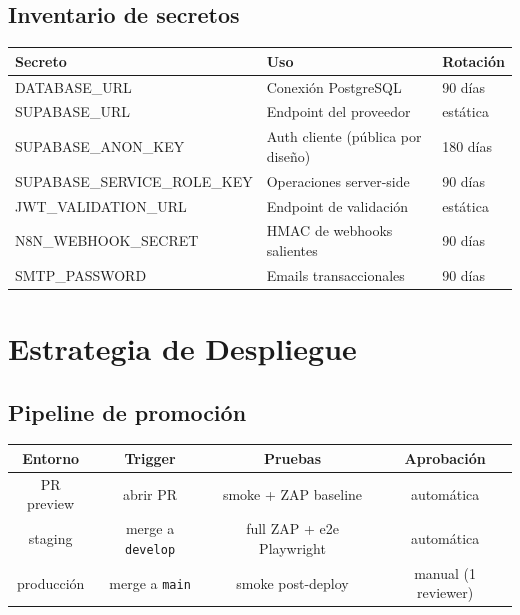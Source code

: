 \documentclass[12pt,a4paper,oneside]{article}
\begin{document}
\subsection{Inventario de secretos}

\begin{table}[h]
\centering
\small
\begin{tabularx}{\textwidth}{lXl}
\toprule
\textbf{Secreto} & \textbf{Uso} & \textbf{Rotación} \\
\midrule
DATABASE\_URL & Conexión PostgreSQL & 90 días \\
SUPABASE\_URL & Endpoint del proveedor & estática \\
SUPABASE\_ANON\_KEY & Auth cliente (pública por diseño) & 180 días \\
SUPABASE\_SERVICE\_ROLE\_KEY & Operaciones server-side & 90 días \\
JWT\_VALIDATION\_URL & Endpoint de validación & estática \\
N8N\_WEBHOOK\_SECRET & HMAC de webhooks salientes & 90 días \\
SMTP\_PASSWORD & Emails transaccionales & 90 días \\
\bottomrule
\end{tabularx}
\end{table}

\section{Estrategia de Despliegue}

\subsection{Pipeline de promoción}

\begin{center}
\begin{tabular}{|c|c|c|c|}
\hline
\rowcolor{accent!20}
\textbf{Entorno} & \textbf{Trigger} & \textbf{Pruebas} & \textbf{Aprobación} \\
\hline
PR preview & abrir PR & smoke + ZAP baseline & automática \\
\hline
staging & merge a \texttt{develop} & full ZAP + e2e Playwright & automática \\
\hline
producción & merge a \texttt{main} & smoke post-deploy & manual (1 reviewer) \\
\hline
\end{tabular}
\end{center}
\end{document}
